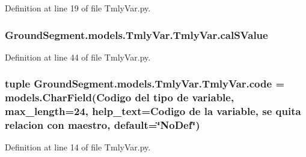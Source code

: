 Definition at line 19 of file Tmly\+Var.\+py.

\hypertarget{class_ground_segment_1_1models_1_1_tmly_var_1_1_tmly_var_ae310487e7ceeb1bbeae164bf4aec0290}{}
\subsubsection[{cal\+S\+Value}]{\setlength{\rightskip}{0pt plus 5cm}Ground\+Segment.\+models.\+Tmly\+Var.\+Tmly\+Var.\+cal\+S\+Value}\label{class_ground_segment_1_1models_1_1_tmly_var_1_1_tmly_var_ae310487e7ceeb1bbeae164bf4aec0290}


Definition at line 44 of file Tmly\+Var.\+py.

\hypertarget{class_ground_segment_1_1models_1_1_tmly_var_1_1_tmly_var_a25d017347ade2540b37c09596f233f0f}{}
\subsubsection[{code}]{\setlength{\rightskip}{0pt plus 5cm}tuple Ground\+Segment.\+models.\+Tmly\+Var.\+Tmly\+Var.\+code = models.\+Char\+Field(\textquotesingle{}Codigo del tipo de variable\textquotesingle{}, max\+\_\+length=24, help\+\_\+text=\textquotesingle{}Codigo de la variable, se quita relacion con maestro\textquotesingle{}, default=\char`\"{}No\+Def\char`\"{})\hspace{0.3cm}{\ttfamily [static]}}\label{class_ground_segment_1_1models_1_1_tmly_var_1_1_tmly_var_a25d017347ade2540b37c09596f233f0f}


Definition at line 14 of file Tmly\+Var.\+py.

\hypertarget{class_ground_segment_1_1models_1_1_tmly_var_1_1_tmly_var_acc0d1d6a558e6194dfd4fbd375df6f67}{}
